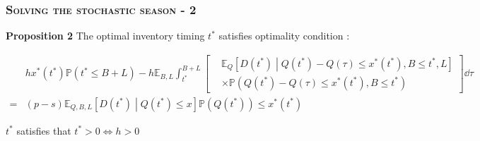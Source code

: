 \documentclass[aspectratio=169]{../presentation}
\begin{document}
    \begin{frame}
        \frametitle{\textsc{Solving the stochastic season - 2}}

        \textrm{\bfseries Proposition 2} The optimal inventory timing $t^*$ satisfies optimality condition :

        \begin{equation}
            \begin{aligned}
                & hx^*\left(t^*\right)\mathbb P(t^*\leq B+L) - h\mathbb E_{B, L}\int_{t^*}^{B+L} \left[\begin{aligned}
                    & \mathbb E_Q \left[D\left(t^*\right)\middle | Q\left(t^*\right) - Q(\tau)\leq x^*\left(t^*\right), B\leq t^*, L\right] \\
                    & \times \mathbb P\left(Q\left(t^*\right) - Q(\tau)\leq x^*\left(t^*\right), B\leq t^*\right)
                \end{aligned}\right] \dd \tau \\
                =& (p-s)\mathbb E_{Q, B, L}\left[D\left(t^*\right)\middle | Q\left(t^*\right)\leq x\right]\mathbb P\left(Q\left(t^*\right)\right)\leq x^*\left(t^*\right)
            \end{aligned}
            \label{eq:3}
        \end{equation}

        $t^*$ satisfies that $t^* > 0\Leftrightarrow h > 0$

    \end{frame}
\end{document}
